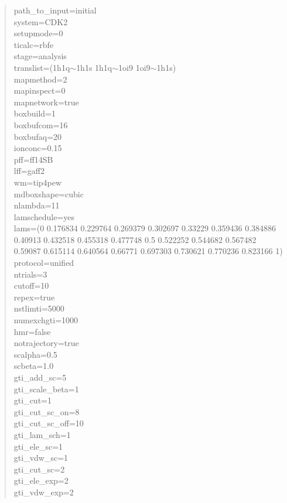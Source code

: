 \documentclass[11pt,letterpaper,titlepage]{article}
\newenvironment{itquote}
  {\begin{quote}\itshape}
  {\end{quote}\ignorespacesafterend}
\begin{document}
\vspace{1cm}
\begin{itquote}
	
{\color{blue}
	
path\_to\_input=initial 			\\
system=CDK2 					\\
setupmode=0                      		\\
ticalc=rbfe                      		\\
stage=analysis                   		\\
translist=(1h1q$\sim$1h1s 1h1q$\sim$1oi9 1oi9$\sim$1h1s) 	\\

mapmethod=2 					\\
mapinspect=0 					\\
mapnetwork=true 				\\

boxbuild=1 					\\
boxbufcom=16  		 			\\
boxbufaq=20		 			\\
ionconc=0.15		 			\\
pff=ff14SB					\\
lff=gaff2					\\
wm=tip4pew					\\
mdboxshape=cubic				\\

nlambda=11  					\\
lamschedule=yes					\\
lams=(0 0.176834 0.229764 0.269379 0.302697 0.33229 0.359436 0.384886 0.40913 0.432518 0.455318 0.477748 0.5 0.522252 0.544682 0.567482 0.59087 0.615114 0.640564 0.66771 0.697303 0.730621 0.770236 0.823166 1) \\
protocol=unified 				\\

ntrials=3					\\

cutoff=10               			\\
repex=true 					\\
nstlimti=5000           			\\
numexchgti=1000         			\\
hmr=false 					\\
notrajectory=true				\\
scalpha=0.5             			\\
scbeta=1.0              			\\
gti\_add\_sc=5 					\\
gti\_scale\_beta=1      			\\
gti\_cut=1              			\\
gti\_cut\_sc\_on=8      			\\
gti\_cut\_sc\_off=10    			\\
gti\_lam\_sch=1         			\\
gti\_ele\_sc=1          			\\
gti\_vdw\_sc=1          			\\
gti\_cut\_sc=2          			\\
gti\_ele\_exp=2         			\\
gti\_vdw\_exp=2         			\\

}
\end{itquote}
\end{document}
